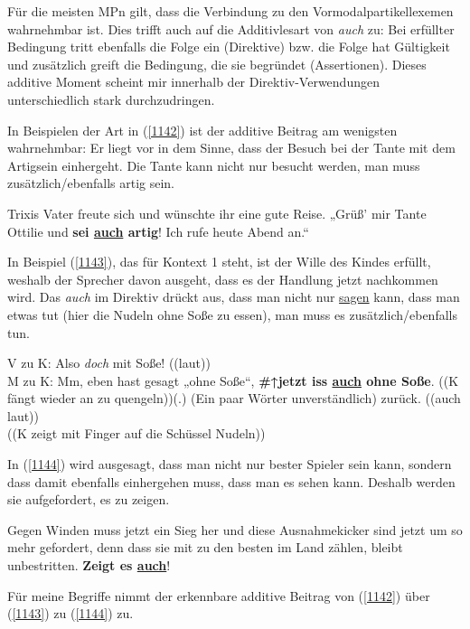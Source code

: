 Für die meisten MPn gilt, dass die Verbindung zu den Vormodalpartikellexemen  wahrnehmbar ist. Dies trifft auch auf die Additivlesart von \textit{auch} zu: Bei erfüllter Bedingung tritt ebenfalls die Folge ein (Direktive) bzw. die Folge hat Gültigkeit und zusätz\-lich greift die Bedingung, die sie begründet (Assertionen). Dieses additive Moment scheint mir innerhalb der Direktiv-Verwendungen unterschiedlich stark durchzudringen.

In Beispielen der Art in (\ref{1142}) ist der additive Beitrag am wenigsten wahrnehmbar: Er liegt vor in dem Sinne, dass der Besuch bei der Tante mit dem Artigsein einhergeht. Die Tante kann nicht nur besucht werden, man muss zusätzlich/ebenfalls artig sein.

\begin{exe}
	\ex\label{1142} 
	Trixis Vater freute sich und wünschte ihr eine gute Reise. „Grüß' mir Tante Ottilie und \textbf{sei \ul{auch} artig}! Ich rufe heute Abend 		an.“
\end{exe}
In Beispiel (\ref{1143}), das für Kontext 1 steht, ist der Wille des Kindes erfüllt, weshalb der Sprecher davon ausgeht, dass es der Handlung jetzt nachkommen wird. Das \textit{auch} im Direktiv drückt aus, dass man nicht nur \ul{sagen} kann, dass man etwas tut (hier die Nudeln ohne Soße zu essen), man muss es zusätzlich/ebenfalls tun.

\begin{exe}
	\ex\label{1143} 

 	V zu K: Also \textit{doch} mit Soße! ((laut))\\
	M zu K: Mm, eben hast gesagt „ohne Soße“, \textbf{\#↑jetzt iss \ul{auch} ohne Soße}. ((K fängt wieder an zu quengeln))(.) 		(Ein paar Wörter unverständlich) zurück. ((auch laut))\\
	((K zeigt mit Finger auf die Schüssel Nudeln))	
\end{exe}
In (\ref{1144}) wird ausgesagt, dass man nicht nur bester Spieler sein kann, sondern dass damit ebenfalls einhergehen muss, dass man es sehen kann. Deshalb werden sie aufgefordert, es zu zeigen.

\begin{exe}
	\ex\label{1144} 

	Gegen Winden muss jetzt ein Sieg her und diese Ausnahmekicker sind jetzt um so mehr gefordert, denn dass sie mit zu den besten im Land zählen, bleibt 		unbestritten. \textbf{Zeigt es \ul{auch}}! 
\end{exe}
Für meine Begriffe nimmt der erkennbare additive Beitrag von (\ref{1142}) über (\ref{1143}) zu (\ref{1144}) zu.

